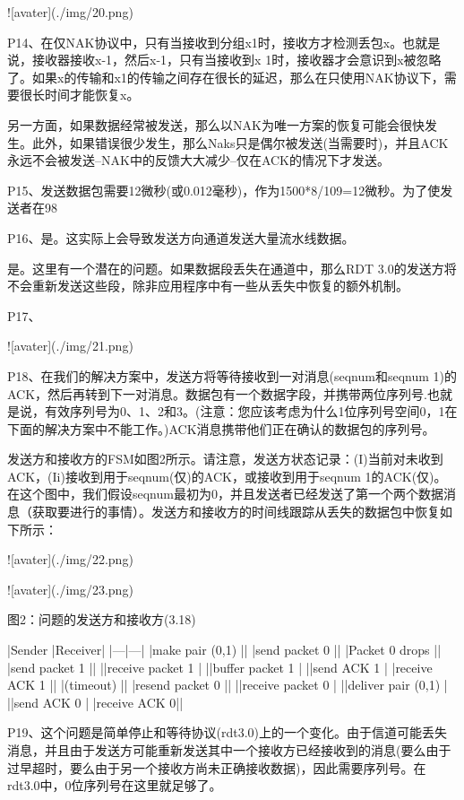 \documentclass[11pt,UTF8,twoside]{article}
\begin{document}
	![avater](./img/20.png)
	
	P14、在仅NAK协议中，只有当接收到分组x1时，接收方才检测丢包x。也就是说，接收器接收x-1，然后x-1，只有当接收到x 1时，接收器才会意识到x被忽略了。如果x的传输和x1的传输之间存在很长的延迟，那么在只使用NAK协议下，需要很长时间才能恢复x。
	
	另一方面，如果数据经常被发送，那么以NAK为唯一方案的恢复可能会很快发生。此外，如果错误很少发生，那么Naks只是偶尔被发送(当需要时)，并且ACK永远不会被发送--NAK中的反馈大大减少--仅在ACK的情况下才发送。
	
	P15、发送数据包需要12微秒(或0.012毫秒)，作为1500*8/109=12微秒。为了使发送者在98%
	
	P16、是。这实际上会导致发送方向通道发送大量流水线数据。
	
	是。这里有一个潜在的问题。如果数据段丢失在通道中，那么RDT 3.0的发送方将不会重新发送这些段，除非应用程序中有一些从丢失中恢复的额外机制。
	
	P17、
	
	![avater](./img/21.png)
	
	P18、在我们的解决方案中，发送方将等待接收到一对消息(seqnum和seqnum 1)的ACK，然后再转到下一对消息。数据包有一个数据字段，并携带两位序列号.也就是说，有效序列号为0、1、2和3。(注意：您应该考虑为什么1位序列号空间0，1在下面的解决方案中不能工作。)ACK消息携带他们正在确认的数据包的序列号。
	
	发送方和接收方的FSM如图2所示。请注意，发送方状态记录：(I)当前对未收到ACK，(Ii)接收到用于seqnum(仅)的ACK，或接收到用于seqnum 1的ACK(仅)。在这个图中，我们假设seqnum最初为0，并且发送者已经发送了第一个两个数据消息（获取要进行的事情）。发送方和接收方的时间线跟踪从丢失的数据包中恢复如下所示：
	
	![avater](./img/22.png)
	
	![avater](./img/23.png)
	
	图2：问题的发送方和接收方(3.18)
	
	|Sender |Receiver| 
	|---|---|
	|make pair (0,1) ||
	|send packet 0 ||
	|Packet 0 drops ||
	|send packet 1 ||
	||receive packet 1 |
	||buffer packet 1 |
	||send ACK 1 |
	|receive ACK 1 ||
	|(timeout) ||
	|resend packet 0 ||
	||receive packet 0 |
	||deliver pair (0,1) |
	||send ACK 0 |
	|receive ACK 0||
	
	P19、这个问题是简单停止和等待协议(rdt3.0)上的一个变化。由于信道可能丢失消息，并且由于发送方可能重新发送其中一个接收方已经接收到的消息(要么由于过早超时，要么由于另一个接收方尚未正确接收数据)，因此需要序列号。在rdt3.0中，0位序列号在这里就足够了。
	
\end{document}
